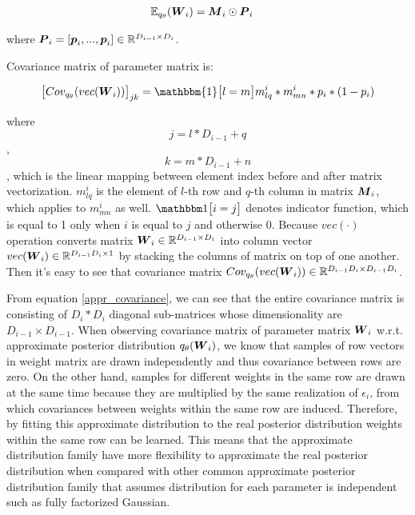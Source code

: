 \begin{equation}
\begin{aligned} \label{appr_expectation}
\mathbb E_{q_{\theta}}(\boldsymbol W_{i}) & = \boldsymbol M_{i} \odot \boldsymbol P_{i}
\end{aligned}
\end{equation}

where $\boldsymbol P_{i} = [\boldsymbol p_{i}, ..., \boldsymbol p_{i}] \in \mathbb R^{D_{i-1} \times D_{i}}$.

Covariance matrix of parameter matrix is:

\begin{equation}
\begin{aligned} \label{appr_covariance}
 \big[Cov_{q_{\theta}}(vec(\bld W_{i}))\big]_{jk}   = \mathbbm{1} \big[l=m\big] m^{i}_{lq}*m^{i}_{mn}*p_{i}*(1-p_{i})
\end{aligned}
\end{equation}

where 
\[ j = l*D_{i-1} + q\],
\[ k = m*D_{i-1} + n\],
which is the linear mapping between element index before and after matrix vectorization. $m^{i}_{lq}$ is the element of $l$-th row and $q$-th column in matrix $\boldsymbol M_{i}$, which applies to $m^{i}_{mn}$ as well. $\mathbbm 1 \big[i=j\big]$ denotes indicator function, which is equal to 1 only when $i$ is equal to $j$ and otherwise 0. Because $vec(\cdot)$ operation converts matrix $\boldsymbol W_{i} \in \mathbb R^{D_{i-1} \times D_{i}}$ into column vector $ vec(\boldsymbol W_{i}) \in \mathbb R^{D_{i-1}D_{i} \times 1}$ by stacking the columns of matrix on top of one another. Then it's easy to see that covariance matrix $Cov_{q_{\theta}}(vec(\boldsymbol W_{i})) \in \mathbb R^{D_{i-1}D_{i} \times D_{i-1}D_{i}} $. 

From equation \ref{appr_covariance}, we can see that the entire covariance matrix is consisting of $D_{i} \ast D_{i}$ diagonal sub-matrices whose dimensionality are $D_{i-1} \times D_{i-1}$.
When observing covariance matrix of parameter matrix $\boldsymbol W_{i}$ w.r.t. approximate posterior distribution $q_{\theta}({\boldsymbol W_{i}})$, we know that samples of row vectors in weight matrix are drawn independently and thus covariance between rows are zero. On the other hand, samples for different weights in the same row are drawn at the same time because they are multiplied by the same realization of $\epsilon_{i}$, from which covariances between weights within the same row are induced. Therefore, by fitting this approximate distribution to the real posterior distribution weights within the same row can be learned. This means that the approximate distribution family have more flexibility to approximate the real posterior distribution when compared with other common approximate posterior distribution family that assumes distribution for each parameter is independent such as fully factorized Gaussian.


